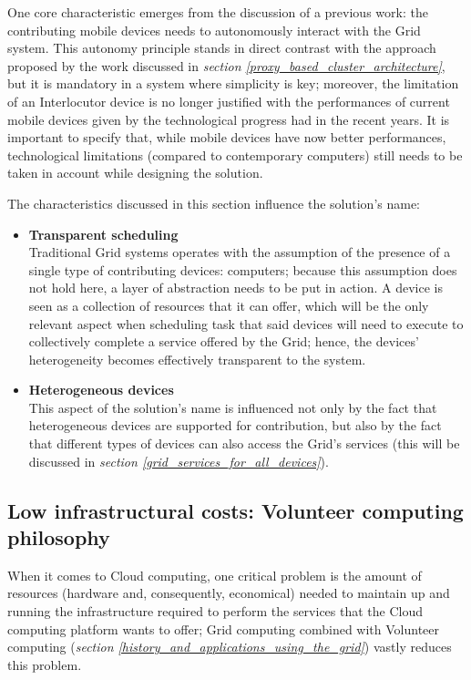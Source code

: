 One core characteristic emerges from the discussion of a previous work: the contributing mobile devices needs to autonomously interact with the Grid system.
This autonomy principle stands in direct contrast with the approach proposed by the work discussed in \textit{section \ref{proxy_based_cluster_architecture}}, but it is mandatory in a system where simplicity is key; moreover, the limitation of an Interlocutor device is no longer justified with the performances of current mobile devices given by the technological progress had in the recent years. It is important to specify that, while mobile devices have now better performances, technological limitations (compared to contemporary computers) still needs to be taken in account while designing the solution.

The characteristics discussed in this section influence the solution's name:
\begin{itemize}
    \item \textbf{Transparent scheduling}\\
    Traditional Grid systems operates with the assumption of the presence of a single type of contributing devices: computers; because this assumption does not hold here, a layer of abstraction needs to be put in action. A device is seen as a collection of resources that it can offer, which will be the only relevant aspect when scheduling task that said devices will need to execute to collectively complete a service offered by the Grid; hence, the devices' heterogeneity becomes effectively transparent to the system.
    \item \textbf{Heterogeneous devices}\\
    This aspect of the solution's name is influenced not only by the fact that heterogeneous devices are supported for contribution, but also by the fact that different types of devices can also access the Grid's services (this will be discussed in \textit{section \ref{grid_services_for_all_devices}}).
\end{itemize}

\subsection{Low infrastructural costs: Volunteer computing philosophy}\label{low_infrastructural_costs_volunteer_computing_philosophy}
When it comes to Cloud computing, one critical problem is the amount of resources (hardware and, consequently, economical) needed to maintain up and running the infrastructure required to perform the services that the Cloud computing platform wants to offer; Grid computing combined with Volunteer computing (\textit{section \ref{history_and_applications_using_the_grid}}) vastly reduces this problem.

